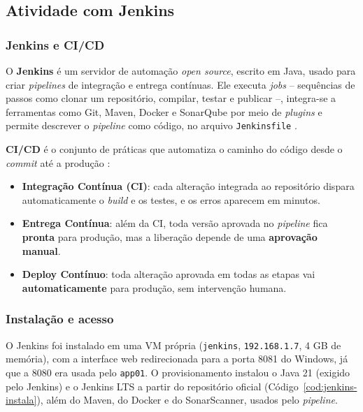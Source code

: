 \subsection{Atividade com Jenkins}\label{sec:jenkins}

\subsubsection{Jenkins e CI/CD}

O \textbf{Jenkins} é um servidor de automação \textit{open source}, escrito em Java, usado para
criar \textit{pipelines} de integração e entrega contínuas. Ele executa \textit{jobs} -- sequências de
passos como clonar um repositório, compilar, testar e publicar --, integra-se a ferramentas como Git,
Maven, Docker e SonarQube por meio de \textit{plugins} e permite descrever o \textit{pipeline} como
código, no arquivo \texttt{Jenkinsfile} \citep{jenkins2026}.

\textbf{CI/CD} é o conjunto de práticas que automatiza o caminho do código desde o \textit{commit} até
a produção \citep{humble2014}:

\begin{itemize}
  \item \textbf{Integração Contínua (CI)}: cada alteração integrada ao repositório dispara
        automaticamente o \textit{build} e os testes, e os erros aparecem em minutos.
  \item \textbf{Entrega Contínua}: além da CI, toda versão aprovada no \textit{pipeline} fica
        \textbf{pronta} para produção, mas a liberação depende de uma \textbf{aprovação manual}.
  \item \textbf{Deploy Contínuo}: toda alteração aprovada em todas as etapas vai
        \textbf{automaticamente} para produção, sem intervenção humana.
\end{itemize}

\subsubsection{Instalação e acesso}

O Jenkins foi instalado em uma VM própria (\texttt{jenkins}, \texttt{192.168.1.7}, 4 GB de memória),
com a interface web redirecionada para a porta 8081 do Windows, já que a 8080 era usada pelo
\texttt{app01}. O provisionamento instalou o Java 21 (exigido pelo Jenkins) e o Jenkins LTS a partir
do repositório oficial (Código~\ref{cod:jenkins-instala}), além do Maven, do Docker e do SonarScanner,
usados pelo \textit{pipeline}.

